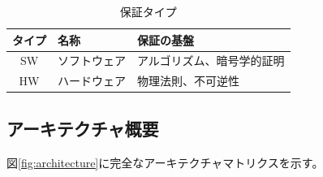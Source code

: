 \documentclass[11pt,a4paper]{article}
\begin{document}
\begin{table}[htbp]
\centering
\caption{保証タイプ}
\label{tab:guarantees}
\begin{tabular}{@{}clp{6cm}@{}}
\toprule
タイプ & 名称 & 保証の基盤 \\
\midrule
SW & ソフトウェア & アルゴリズム、暗号学的証明 \\
HW & ハードウェア & 物理法則、不可逆性 \\
\bottomrule
\end{tabular}
\end{table}

\subsection{アーキテクチャ概要}

図\ref{fig:architecture}に完全なアーキテクチャマトリクスを示す。
\end{document}
